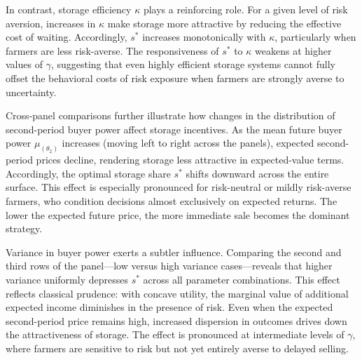 In contrast, storage efficiency $\kappa$ plays a reinforcing role. For a given level of risk aversion, increases in $\kappa$ make storage more attractive by reducing the effective cost of waiting. Accordingly, $s^*$ increases monotonically with $\kappa$, particularly when farmers are less risk-averse. The responsiveness of $s^*$ to $\kappa$ weakens at higher values of $\gamma$, suggesting that even highly efficient storage systems cannot fully offset the behavioral costs of risk exposure when farmers are strongly averse to uncertainty. 


Cross-panel comparisons further illustrate how changes in the distribution of second-period buyer power affect storage incentives. As the mean future buyer power $\mu_{(\theta_2)}$ increases (moving left to right across the panels), expected second-period prices decline, rendering storage less attractive in expected-value terms. Accordingly, the optimal storage share $s^*$ shifts downward across the entire surface. This effect is especially pronounced for risk-neutral or mildly risk-averse farmers, who condition decisions almost exclusively on expected returns. The lower the expected future price, the more immediate sale becomes the dominant strategy.



Variance in buyer power exerts a subtler influence. Comparing the second and third rows of the panel—low versus high variance cases—reveals that higher variance uniformly depresses $s^*$ across all parameter combinations. This effect reflects classical prudence: with concave utility, the marginal value of additional expected income diminishes in the presence of risk. Even when the expected second-period price remains high, increased dispersion in outcomes drives down the attractiveness of storage. The effect is pronounced at intermediate levels of $\gamma$, where farmers are sensitive to risk but not yet entirely averse to delayed selling.






